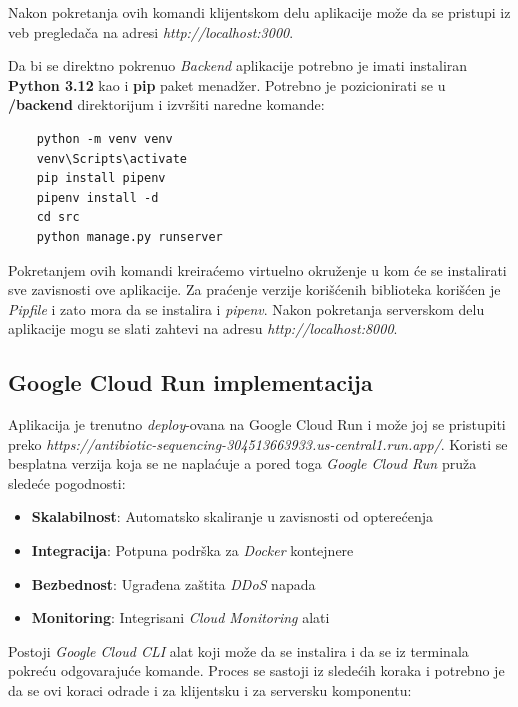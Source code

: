 \documentclass[12pt,oneside]{memoir}
\begin{document}
Nakon pokretanja ovih komandi klijentskom delu aplikacije može da se pristupi iz veb pregledača na adresi \emph{http://localhost:3000}.

Da bi se direktno pokrenuo \emph{Backend} aplikacije potrebno je imati instaliran \textbf{Python 3.12} kao i \textbf{pip} paket menadžer. Potrebno je pozicionirati se u \textbf{/backend} direktorijum i izvršiti naredne komande:  
\begin{verbatim}
    python -m venv venv
    venv\Scripts\activate
    pip install pipenv
    pipenv install -d
    cd src
    python manage.py runserver
\end{verbatim}

Pokretanjem ovih komandi kreiraćemo virtuelno okruženje u kom će se instalirati sve zavisnosti ove aplikacije. Za praćenje verzije korišćenih biblioteka korišćen je \emph{Pipfile} i zato mora da se instalira i \emph{pipenv}.
Nakon pokretanja serverskom delu aplikacije mogu se slati zahtevi na adresu \emph{http://localhost:8000}.

\subsection{Google Cloud Run implementacija}
Aplikacija je trenutno \emph{deploy}-ovana na Google Cloud Run i može joj se pristupiti preko \emph{https://antibiotic-sequencing-304513663933.us-central1.run.app/}.
Koristi se besplatna verzija koja se ne naplaćuje a pored toga \emph{Google Cloud Run} pruža sledeće pogodnosti:

\begin{itemize}
\item \textbf{Skalabilnost}: Automatsko skaliranje u zavisnosti od opterećenja
\item \textbf{Integracija}: Potpuna podrška za \emph{Docker} kontejnere
\item \textbf{Bezbednost}: Ugrađena zaštita \emph{DDoS} napada
\item \textbf{Monitoring}: Integrisani \emph{Cloud Monitoring} alati
\end{itemize}

Postoji \emph{Google Cloud CLI} alat koji može da se instalira i da se iz terminala pokreću odgovarajuće komande. Proces se sastoji iz sledećih koraka i potrebno je da se ovi koraci odrade i za klijentsku i za serversku komponentu:
\end{document}
